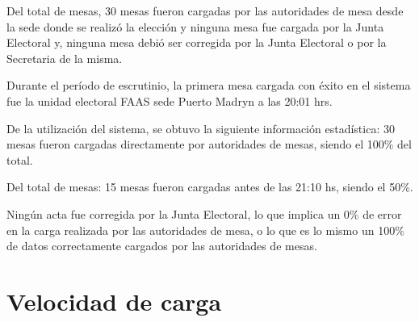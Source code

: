 Del total de mesas, 30 mesas fueron cargadas por las autoridades de mesa desde la sede donde se realizó la elección y ninguna mesa fue cargada por la Junta Electoral y, ninguna mesa debió ser corregida por la Junta Electoral o por la Secretaria de la misma.

Durante el período de escrutinio, la primera mesa cargada con éxito en el sistema fue la unidad electoral FAAS sede Puerto Madryn a las 20:01 hrs.

De la utilización del sistema, se obtuvo la siguiente información estadística:
30 mesas fueron cargadas directamente por autoridades de mesas, siendo el 100\% del total.

Del total de mesas:
15 mesas fueron cargadas antes de las 21:10 hs, siendo el 50\%.

Ningún acta fue corregida por la Junta Electoral, lo que implica un 0\% de error en la carga realizada por las autoridades de mesa, o lo que es lo mismo un 100\% de datos correctamente cargados por las autoridades de mesas.

\section{Velocidad de carga}

